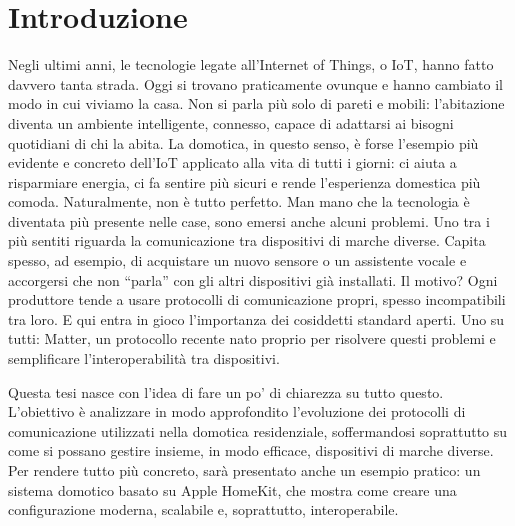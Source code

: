 \chapter{Introduzione}
Negli ultimi anni, le tecnologie legate all'Internet of Things, o IoT, hanno fatto davvero tanta strada. Oggi si trovano praticamente ovunque e hanno cambiato il modo in cui viviamo la casa. Non si parla più solo di pareti e mobili: l'abitazione diventa un ambiente intelligente, connesso, capace di adattarsi ai bisogni quotidiani di chi la abita. La domotica, in questo senso, è forse l'esempio più evidente e concreto dell'IoT applicato alla vita di tutti i giorni: ci aiuta a risparmiare energia, ci fa sentire più sicuri e rende l'esperienza domestica più comoda.
\vspace{0.5cm}
Naturalmente, non è tutto perfetto. Man mano che la tecnologia è diventata più presente nelle case, sono emersi anche alcuni problemi. Uno tra i più sentiti riguarda la comunicazione tra dispositivi di marche diverse. Capita spesso, ad esempio, di acquistare un nuovo sensore o un assistente vocale e accorgersi che non ``parla'' con gli altri dispositivi già installati. Il motivo? Ogni produttore tende a usare protocolli di comunicazione propri, spesso incompatibili tra loro. E qui entra in gioco l'importanza dei cosiddetti standard aperti. Uno su tutti: Matter, un protocollo recente nato proprio per risolvere questi problemi e semplificare l'interoperabilità tra dispositivi.

\vspace{0.5cm}
Questa tesi nasce con l'idea di fare un po' di chiarezza su tutto questo. L'obiettivo è analizzare in modo approfondito l'evoluzione dei protocolli di comunicazione utilizzati nella domotica residenziale, soffermandosi soprattutto su come si possano gestire insieme, in modo efficace, dispositivi di marche diverse. Per rendere tutto più concreto, sarà presentato anche un esempio pratico: un sistema domotico basato su Apple HomeKit, che mostra come creare una configurazione moderna, scalabile e, soprattutto, interoperabile.

